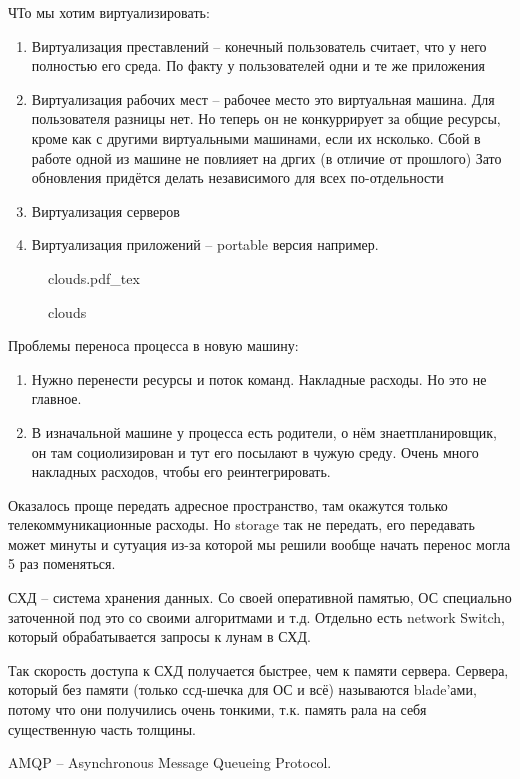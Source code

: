 \documentclass{book}
\theoremstyle{definition}
\newcommand{\incfig}[1]{%
    \def\svgwidth{\columnwidth}
    {#1.pdf_tex}
}
\begin{document}
ЧТо мы хотим виртуализировать:
\begin{enumerate}
    \item Виртуализация преставлений -- конечный пользователь считает, что у него полностью его среда. По факту у пользователей одни и те же приложения
    \item Виртуализация рабочих мест -- рабочее место это виртуальная машина. Для пользователя разницы нет. Но теперь он не конкуррирует за общие ресурсы, кроме как с другими виртуальными машинами, если их нсколько. Сбой в работе одной из машине не повлияет на дргих (в отличие от прошлого) Зато обновления придётся делать независимого для всех по-отдельности
    \item Виртуализация серверов
    \item Виртуализация приложений -- portable версия например. 
\end{enumerate}

\begin{figure}[!ht]
    \centering
    \incfig{clouds}
    \caption{clouds}
    \label{fig:clouds}
\end{figure}

Проблемы переноса процесса в новую машину:
\begin{enumerate}
    \item Нужно перенести ресурсы и поток команд. Накладные расходы. Но это не главное.
    \item В изначальной машине у процесса есть родители, о нём знаетпланировщик, он там социолизирован и тут его посылают в чужую среду. Очень много накладных расходов, чтобы его реинтегрировать.
\end{enumerate}

Оказалось проще передать адресное пространство, там окажутся только телекоммуникационные расходы. Но storage так не передать, его передавать может минуты и сутуация из-за которой мы решили вообще начать перенос могла 5 раз поменяться.

СХД -- система хранения данных. Со своей оперативной памятью, ОС специально заточенной под это со своими алгоритмами и т.д. Отдельно есть network Switch, который обрабатывается запросы к лунам в СХД.

Так скорость доступа к СХД получается быстрее, чем к памяти сервера. Сервера, который без памяти (только ссд-шечка для ОС и всё) называются blade'ами, потому что они получились очень тонкими, т.к. память рала на себя существенную часть толщины.

AMQP -- Asynchronous Message Queueing Protocol.
\end{document}
